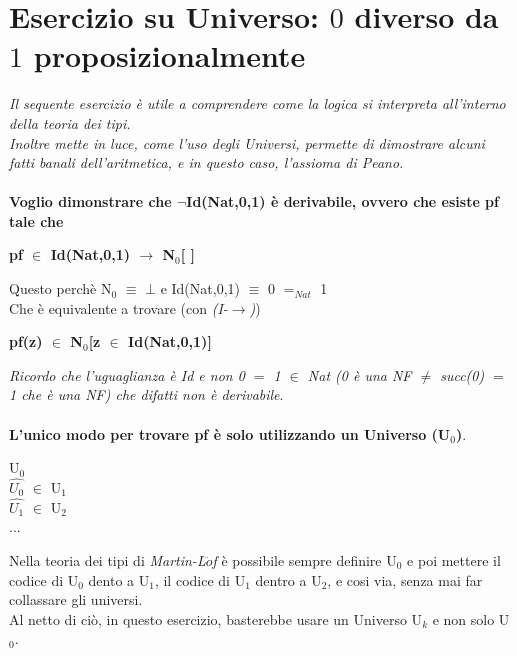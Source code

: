 \section{Esercizio su Universo: $0$ diverso da $1$ proposizionalmente}
\label{sec:esercizio-su-universo}
\textit{Il sequente esercizio \`e utile a comprendere come la logica si interpreta all'interno della teoria dei tipi.\\
Inoltre mette in luce, come l'uso degli Universi, permette di dimostrare alcuni fatti banali dell'aritmetica, e in questo caso, l'assioma di Peano.}\\\\
\noindent
\textbf{Voglio dimonstrare che $\neg$Id(Nat,0,1) \`e derivabile, ovvero che esiste pf tale che} 
\begin{center}\textbf{pf $\in$ Id(Nat,0,1) $\rightarrow$ N$_0$[ ]}\end{center}
Questo perch\`e N$_0$ $\equiv$ $\bot$ e Id(Nat,0,1) $\equiv$ $0$ $=_{Nat}$ 1\\
Che \`e equivalente  a trovare  (con \textit{(I-$\rightarrow$)})
\begin{center}\textbf{pf(z) $\in$ N$_0$[z $\in$ Id(Nat,0,1)]}\end{center}
\noindent \textit{Ricordo che l'uguaglianza \`e Id e non 0 $=$ 1 $\in$ Nat (0 \`e una NF $\neq$ succ(0) $=$ 1 che \`e una NF) che difatti non \`e derivabile}.\\\\
\noindent \textbf{L'unico modo per trovare pf \`e solo utilizzando un Universo (U$_0$)}.
\begin{center}
U$_0$\\
$\hat{U_0}$ $\in$ U$_1$\\
$\hat{U_1}$ $\in$ U$_2$\\
...
\end{center}
\noindent
Nella teoria dei tipi di \textit{Martin-L$\ddot{o}$f} \`e possibile sempre definire U$_0$ e poi mettere il codice di U$_0$ dento a U$_1$, il codice di U$_1$ dentro a U$_2$, e cosi via, senza mai far collassare gli universi.\\
Al netto di ci\`o, in questo esercizio, basterebbe usare un Universo U$_k$ e non solo U$_0$.


